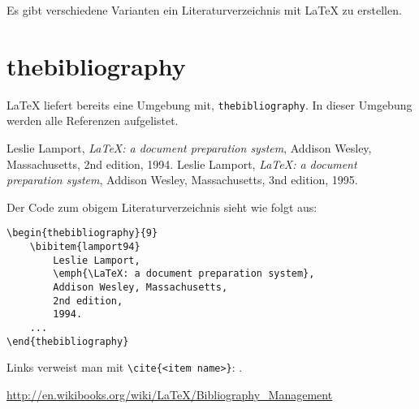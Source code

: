 \documentclass[a4paper]{article}
\begin{document}
Es gibt verschiedene Varianten ein Literaturverzeichnis mit \LaTeX{} zu
erstellen.



\tableofcontents

\section{thebibliography}
\LaTeX{} liefert bereits eine Umgebung mit, \verb+thebibliography+. In dieser
Umgebung werden alle Referenzen aufgelistet.
\begin{thebibliography}{9}
		Leslie Lamport,
		\emph{\LaTeX: a document preparation system},
		Addison Wesley, Massachusetts,
		2nd edition,
		1994.
		Leslie Lamport,
		\emph{\LaTeX: a document preparation system},
		Addison Wesley, Massachusetts,
		3nd edition,
		1995.
\end{thebibliography}

Der Code zum obigem Literaturverzeichnis sieht wie folgt aus:
\begin{lstlisting}[]
\begin{thebibliography}{9}
	\bibitem{lamport94}
		Leslie Lamport,
		\emph{\LaTeX: a document preparation system},
		Addison Wesley, Massachusetts,
		2nd edition,
		1994.
	...
\end{thebibliography}
\end{lstlisting}

Links verweist man mit \verb+\cite{<item name>}+: \cite{lamport94}.


\url{http://en.wikibooks.org/wiki/LaTeX/Bibliography_Management}
\end{document}
